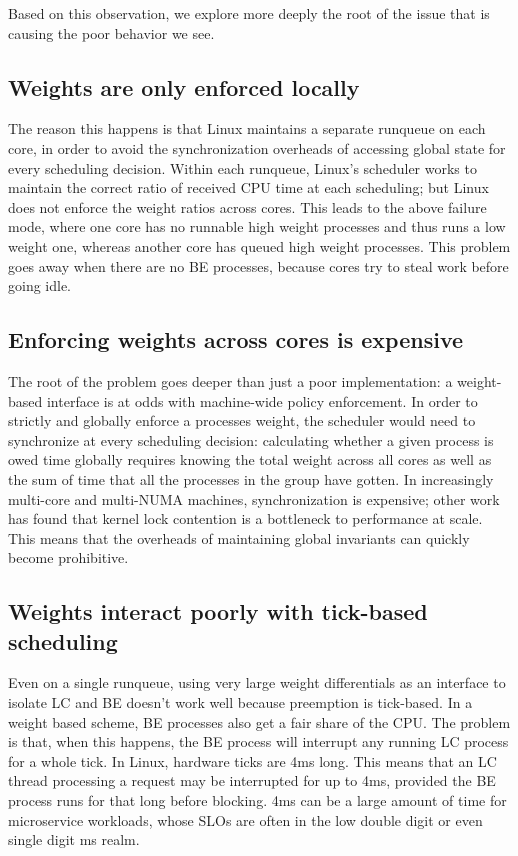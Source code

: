 Based on this observation, we explore more deeply the root of the issue that is
causing the poor behavior we see.

\subsection{Weights are only enforced locally}\label{ss:problem:mechanistic}

The reason this happens is that Linux maintains a separate runqueue on each
core, in order to avoid the synchronization overheads of accessing global state
for every scheduling decision. Within each runqueue, Linux's scheduler works to
maintain the correct ratio of received CPU time at each scheduling; but Linux
does not enforce the weight ratios across cores. This leads to the above failure
mode, where one core has no runnable high weight processes and thus runs a low
weight one, whereas another core has queued high weight processes. This problem
goes away when there are no BE processes, because cores try to steal work before
going idle.

\subsection{Enforcing weights across cores is
expensive}\label{ss:problem:cross-core-hard}

The root of the problem goes deeper than just a poor implementation: a
weight-based interface is at odds with machine-wide policy enforcement. In order
to strictly and globally enforce a processes weight, the scheduler would need to
synchronize at every scheduling decision: calculating whether a given process is
owed time globally requires knowing the total weight across all cores as well as
the sum of time that all the processes in the group have gotten. In increasingly
multi-core and multi-NUMA machines, synchronization is expensive; other work has
found that kernel lock contention is a bottleneck to performance at
scale.~\cite{afaas} This means that the overheads of maintaining global
invariants can quickly become prohibitive.


\subsection{Weights interact poorly with tick-based
scheduling}\label{ss:problem:quantum}

Even on a single runqueue, using very large weight differentials as an interface
to isolate LC and BE doesn't work well because preemption is tick-based. In a
weight based scheme, BE processes also get a fair share of the CPU. The problem
is that, when this happens, the BE process will interrupt any running LC process
for a whole tick. In Linux, hardware ticks are 4ms long. This means that an LC
thread processing a request may be interrupted for up to 4ms, provided the BE
process runs for that long before blocking. 4ms can be a large amount of time
for microservice workloads, whose SLOs are often in the low double digit or even
single digit ms realm.~\cite{sigmaos}



